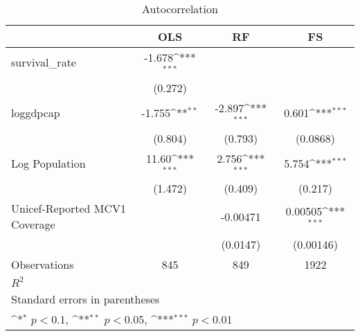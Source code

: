 \begin{table}[htbp]\centering
\def\sym#1{\ifmmode^{#1}\else\(^{#1}\)\fi}
\caption{Autocorrelation}
\begin{tabular}{l*{3}{c}}
\toprule
                &\multicolumn{1}{c}{OLS}&\multicolumn{1}{c}{RF}&\multicolumn{1}{c}{FS}\\
\midrule
survival\_rate   &   -1.678\sym{***}&                  &                  \\
                &  (0.272)         &                  &                  \\
\addlinespace
loggdpcap       &   -1.755\sym{**} &   -2.897\sym{***}&    0.601\sym{***}\\
                &  (0.804)         &  (0.793)         & (0.0868)         \\
\addlinespace
Log Population  &    11.60\sym{***}&    2.756\sym{***}&    5.754\sym{***}\\
                &  (1.472)         &  (0.409)         &  (0.217)         \\
\addlinespace
Unicef-Reported MCV1 Coverage&                  & -0.00471         &  0.00505\sym{***}\\
                &                  & (0.0147)         &(0.00146)         \\
\midrule
Observations    &      845         &      849         &     1922         \\
\(R^{2}\)       &                  &                  &                  \\
\bottomrule
\multicolumn{4}{l}{\footnotesize Standard errors in parentheses}\\
\multicolumn{4}{l}{\footnotesize \sym{*} \(p<0.1\), \sym{**} \(p<0.05\), \sym{***} \(p<0.01\)}\\
\end{tabular}
\end{table}
